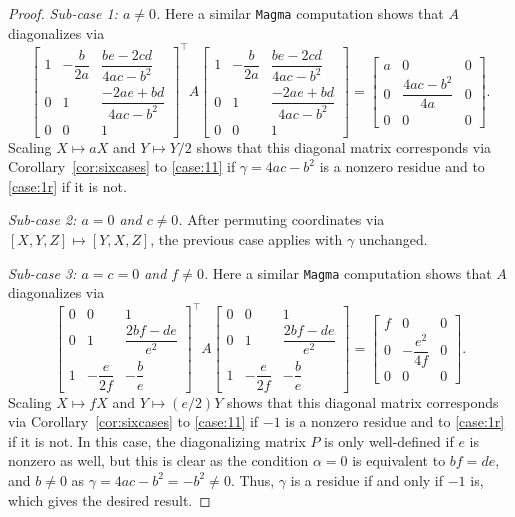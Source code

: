 \documentclass[10pt,a4paper]{amsart}
\numberwithin{equation}{section}
\numberwithin{figure}{section}
\numberwithin{table}{section}
\theoremstyle{definition}
\theoremstyle{plain}
\theoremstyle{remark}
\theoremstyle{plain}
\theoremstyle{definition}
\theoremstyle{plain}
\theoremstyle{plain}
\begin{document}
\begin{proof}
\emph{Sub-case 1: $a\ne 0$.} Here a similar \texttt{Magma} computation shows that $A$ diagonalizes via
		\begin{equation*}
		\begin{bmatrix}
		1 & -\dfrac{b}{2a} & \dfrac{be - 2cd}{4ac - b^2}\\
		0 & 1 & \dfrac{-2ae + bd}{4ac - b^2} \\
		0 & 0 & 1
		\end{bmatrix}^\top\!
		A
		\begin{bmatrix}
		1 & -\dfrac{b}{2a} & \dfrac{be - 2cd}{4ac - b^2}\\
		0 & 1 & \dfrac{-2ae + bd}{4ac - b^2} \\
		0 & 0 & 1
		\end{bmatrix}
		=
		\begin{bmatrix}
		a&0&0\\
		0&\dfrac{4ac-b^2}{4a}&0\\
		0&0&0
		\end{bmatrix}.
		\end{equation*}
		Scaling $X\mapsto aX$ and $Y\mapsto Y/2$ shows that this diagonal matrix corresponds via Corollary~\ref{cor:sixcases} to \eqref{case:11} if $\gamma=4ac-b^2$ is a nonzero residue and to \eqref{case:1r} if it is not.

        \emph{Sub-case 2: $a=0$ and $c\ne 0$.} After permuting coordinates via $[X,Y,Z]\mapsto[Y,X,Z]$, the previous case applies with $\gamma$ unchanged.

		\emph{Sub-case 3: $a=c=0$ and $f\ne 0$.} Here a similar \texttt{Magma} computation shows that $A$ diagonalizes via
		\begin{equation*}
		\begin{bmatrix}
		0 & 0 & 1\\
		0 & 1 & \dfrac{2bf - de}{e^2}\\
		1 & -\dfrac{e}{2f} & -\dfrac{b}{e}
		\end{bmatrix}^\top\!
		A
		\begin{bmatrix}
		0 & 0 & 1\\
		0 & 1 & \dfrac{2bf - de}{e^2}\\
		1 & -\dfrac{e}{2f} & -\dfrac{b}{e}
		\end{bmatrix}
		=
		\begin{bmatrix}
		f&0&0\\
		0&-\dfrac{e^2}{4f}&0\\
		0&0&0
		\end{bmatrix}.
		\end{equation*}
		Scaling $X\mapsto fX$ and $Y\mapsto(e/2)Y$ shows that this diagonal matrix corresponds via Corollary~\ref{cor:sixcases} to \eqref{case:11} if $-1$ is a nonzero residue and to \eqref{case:1r} if it is not. In this case, the diagonalizing matrix $P$ is only well-defined if $e$ is nonzero as well, but this is clear as the condition $\alpha=0$ is equivalent to $bf=de$, and $b\ne 0$ as $\gamma=4ac-b^2=-b^2\ne 0$. Thus, $\gamma$ is a residue if and only if $-1$ is, which gives the desired result.


\end{proof}
\end{document}
